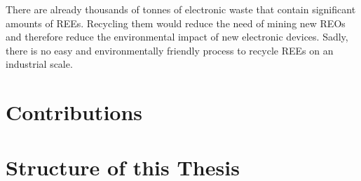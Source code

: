 There are already thousands of tonnes of electronic waste that contain significant amounts of REEs. Recycling them would reduce the need of mining new REOs and therefore reduce the environmental impact of new electronic devices.
Sadly, there is no easy and environmentally friendly process to recycle REEs on an industrial scale.


\section{Contributions\authorB{}}


\section{Structure of this Thesis\authorB{}}



